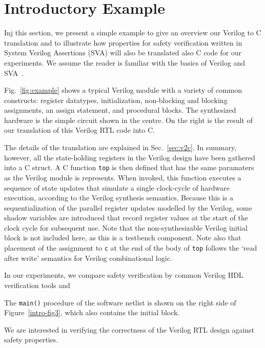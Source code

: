 \section{Introductory Example} 

Inj this section, we present a simple example to give an overview our Verilog to C translation and to illustrate how properties for safety verification written in System Verilog Assertions (SVA) will also be translated also C code for our experiments. We assume the reader is familiar with the basics of Verilog and SVA~\cite{verilog}. 

Fig.~\ref{fig:example} shows a typical Verilog module with a variety of common constructs: register datatypes, initialization, non-blocking and blocking assignments, an assign statement, and procedural blocks.  The synthesized hardware is the simple circuit shown in the centre.  On the right is the result of our translation of this Verilog RTL code into C.

The details of the translation are explained in Sec.~\ref{sec:v2c}. In summary, however, all the state-holding registers in the Verilog design have been gathered into a C struct. A C function \texttt{top} is then defined that has the same paramaters as the Verilog module is represents. When invoked, this function executes a sequence of state updates that simulate a single clock-cycle of hardware execution, according to the Verilog synthesis semantics. Because this is a sequentialization of the parallel register updates modelled by the Verilog, some shadow variables are introduced that record register values at the start of the clock cycle for subsequent use. Note that the non-synthesizable Verilog initial block is not included here, as this is a testbench component. Note also that placement of the assignment to \texttt{c} at the end of the body of \texttt{top} follows the `read after write' semantics for Verilog combinational logic.

In our experiments, we compare safety verification by common Verilog HDL verification tools and 

The \texttt{main()} procedure of 
the software netlist is shown on the right side of Figure~\ref{intro-fig3}, 
which also contains the initial block.
%  

We are interested in verifying the correctness of the Verilog RTL design 
against safety properties. 
%

